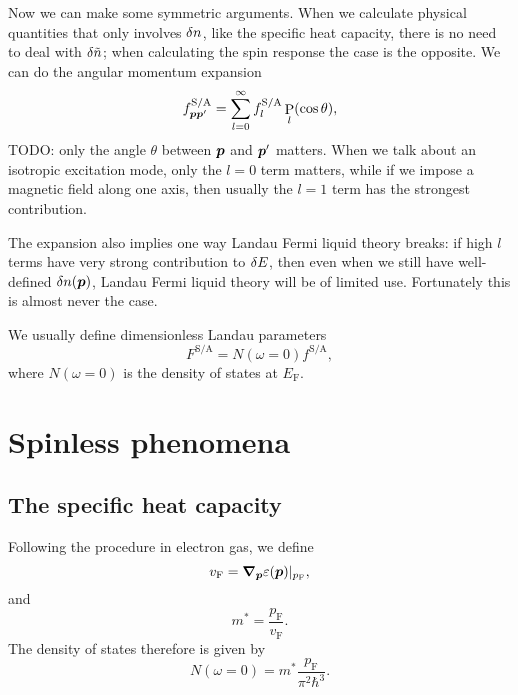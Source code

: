 \documentclass[hyperref, a4paper]{article}
\DeclareMathOperator{\legpoly}{P}
\newcommand*{\efermi}{E_{\text{F}}}
\newcommand*{\pfermi}{p_{\text{F}}}
\newcommand*{\vfermi}{v_{\text{F}}}
\begin{document}
Now we can make some symmetric arguments.
When we calculate physical quantities that only involves $\var{n}$, 
like the specific heat capacity, 
there is no need to deal with $\var{\tilde{n}}$;
when calculating the spin response the case is the opposite. 
We can do the angular momentum expansion 
\begin{equation}
    f^{\text{S/A}}_{\vb*{p} \vb*{p}'} = \sum_{l=0}^{\infty} f^{\text{S/A}}_l \legpoly_l(\cos \theta), 
    \label{eq:landau-liquid.angular-expansion}
\end{equation}
TODO: only the angle $\theta$ between $\vb*{p}$ and $\vb*{p}'$ matters. 
When we talk about an isotropic excitation mode, 
only the $l = 0$ term matters, 
while if we impose a magnetic field along one axis, 
then usually the $l = 1$ term has the strongest contribution. 

The expansion  
also implies one way Landau Fermi liquid theory breaks: 
if high $l$ terms have very strong contribution to $\var{E}$, 
then even when we still have well-defined $\var{n(\vb*{p})}$, 
Landau Fermi liquid theory will be of limited use. 
Fortunately this is almost never the case. 

We usually define dimensionless Landau parameters 
\begin{equation}
    F^{\text{S/A}} = N(\omega = 0) f^{\text{S/A}},
\end{equation}
where $N(\omega = 0)$ is the density of states at $\efermi$.

\section{Spinless phenomena}

\subsection{The specific heat capacity}

Following the procedure in electron gas, 
we define 
\begin{equation}
    \vfermi = \grad_{\vb*{p}} \varepsilon(\vb*{p}) |_{\pfermi}, 
\end{equation}
and 
\begin{equation}
    m^* = \frac{\pfermi}{\vfermi}.
\end{equation}
The density of states therefore is given by 
\begin{equation}
    N(\omega = 0) = m^* \frac{\pfermi}{\pi^2 \hbar^3}.
\end{equation}
\end{document}
